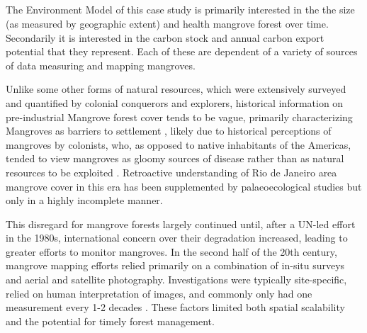 \subsection{} \label{sec:rio-evdt-method}

\subsubsection{} \label{sec:rio-evdt-e-method}

The Environment Model of this case study is primarily interested in the the size (as measured by geographic extent) and health mangrove forest over time. Secondarily it is interested in the carbon stock and annual carbon export potential that they represent. Each of these are dependent of a variety of sources of data measuring and mapping mangroves.

Unlike some other forms of natural resources, which were extensively surveyed and quantified by colonial conquerors and explorers, historical information on pre-industrial Mangrove forest cover tends to be vague, primarily characterizing Mangroves as barriers to settlement \cite{amadorBaiaGuanabaraOcupacao2013}, likely due to historical perceptions of mangroves by colonists, who, as opposed to native inhabitants of the Americas, tended to view mangroves as gloomy sources of disease rather than as natural resources to be exploited \cite{friessEcosystemServicesDisservices2016}. Retroactive understanding of Rio de Janeiro area mangrove cover in this era has been supplemented by palaeoecological studies \cite{vilelaLateHoloceneEvolution2014} but only in a highly incomplete manner. 

This disregard for mangrove forests largely continued until, after a UN-led effort in the 1980s, international concern over their degradation increased, leading to greater efforts to monitor mangroves. In the second half of the 20th century, mangrove mapping efforts relied primarily on a combination of in-situ surveys and aerial and satellite photography. Investigations were typically site-specific, relied on human interpretation of images, and commonly only had one measurement every 1-2 decades \cite{lacerdaluizandmenezesmarceloandmussimolisanimauricioChangesMangroveExtension2007, fromardHalfCenturyDynamic2004}. These factors limited both spatial scalability and the potential for timely forest management. 


